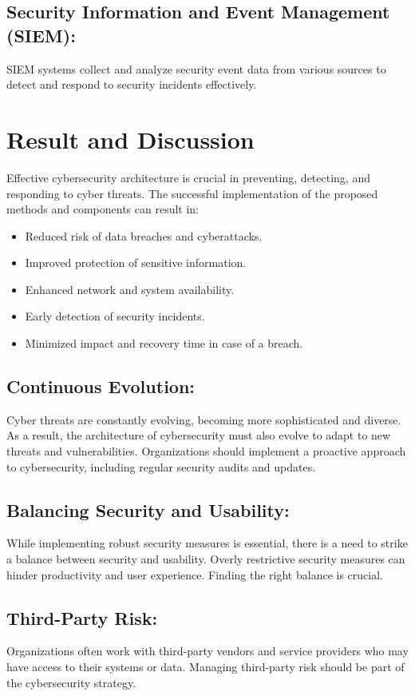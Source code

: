 \documentclass[12pt]{report}
\begin{document}
\subsection*{Security Information and Event Management (SIEM):} SIEM systems collect and analyze security event data from various sources to detect and respond to security incidents effectively.



\newpage
\section*{Result and Discussion}
Effective cybersecurity architecture is crucial in preventing, detecting, and responding to cyber threats. The successful implementation of the proposed methods and components can result in:\cite{remote}
\begin{itemize}
    \item Reduced risk of data breaches and cyberattacks.
    \item Improved protection of sensitive information.
    \item Enhanced network and system availability.
    \item Early detection of security incidents.
    \item Minimized impact and recovery time in case of a breach.
\end{itemize}
\subsection*{Continuous Evolution: } Cyber threats are constantly evolving, becoming more sophisticated and diverse. As a result, the architecture of cybersecurity must also evolve to adapt to new threats and vulnerabilities. Organizations should implement a proactive approach to cybersecurity, including regular security audits and updates.\cite{future}
\subsection*{Balancing Security and Usability:} While implementing robust security measures is essential, there is a need to strike a balance between security and usability. Overly restrictive security measures can hinder productivity and user experience. Finding the right balance is crucial.
\subsection*{Third-Party Risk:} Organizations often work with third-party vendors and service providers who may have access to their systems or data. Managing third-party risk should be part of the cybersecurity strategy.
\end{document}
